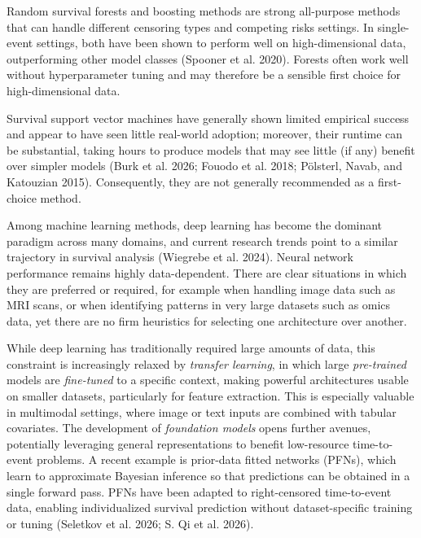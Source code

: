 \documentclass[
  letterpaper,
  krantz2]{style/krantz}
\begin{document}
Random survival forests and boosting methods are strong all-purpose
methods that can handle different censoring types and competing risks
settings.
In single-event settings, both have been shown to perform well on
high-dimensional data, outperforming other model classes (Spooner et al.
2020). Forests often work well without
hyperparameter tuning and may therefore be a sensible first choice for
high-dimensional data.

Survival support vector machines have generally shown limited empirical
success and appear to have seen little real-world adoption; moreover,
their runtime can be substantial, taking hours to produce models that
may see little (if any) benefit over simpler models (Burk et al. 2026;
Fouodo et al. 2018; Pölsterl, Navab, and Katouzian 2015). Consequently,
they are not generally recommended as a first-choice
method.

Among machine learning methods, deep learning has become the dominant
paradigm across many domains, and current research trends point to a
similar trajectory in survival analysis (Wiegrebe et al.
2024). Neural network performance remains highly
data-dependent. There are clear situations in which they are preferred
or required, for example when handling image data such as MRI scans, or
when identifying patterns in very large datasets such as omics data, yet
there are no firm heuristics for selecting one architecture over
another.

While deep learning has traditionally required large amounts of data,
this constraint is increasingly relaxed by \emph{transfer learning}, in
which large \emph{pre-trained} models are \emph{fine-tuned} to a
specific context, making powerful architectures usable on smaller
datasets, particularly for feature extraction.
This is especially valuable in multimodal settings, where image or text
inputs are combined with tabular covariates. The
development of \emph{foundation models} opens further avenues,
potentially leveraging general representations to benefit low-resource
time-to-event problems. A recent example is
prior-data fitted networks (PFNs), which learn to approximate Bayesian
inference so that predictions can be obtained in a single forward pass.
PFNs have been adapted to right-censored time-to-event data, enabling
individualized survival prediction without dataset-specific training or
tuning (Seletkov et al. 2026; S. Qi et al.
2026).
\end{document}
